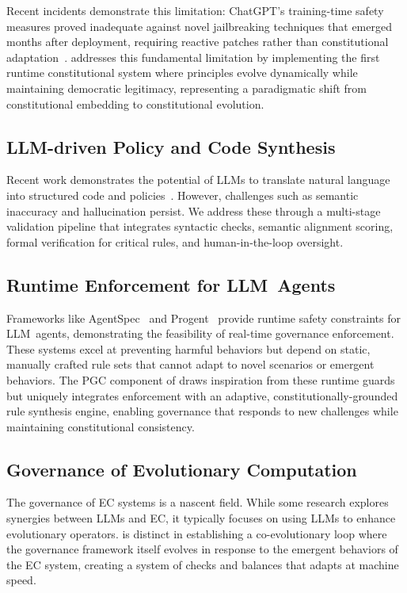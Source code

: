 Recent incidents demonstrate this limitation: ChatGPT's training-time safety measures proved inadequate against novel jailbreaking techniques that emerged months after deployment, requiring reactive patches rather than constitutional adaptation~\cite{wei2023jailbroken}. \acgs{} addresses this fundamental limitation by implementing the first runtime constitutional system where principles evolve dynamically while maintaining democratic legitimacy, representing a paradigmatic shift from constitutional embedding to constitutional evolution.

\subsection{LLM-driven Policy and Code Synthesis}
Recent work demonstrates the potential of LLMs to translate natural language into structured code and policies~\cite{propertygpt2023, veriplan2023}. However, challenges such as semantic inaccuracy and hallucination persist. We address these through a multi-stage validation pipeline that integrates syntactic checks, semantic alignment scoring, formal verification for critical rules, and human-in-the-loop oversight.

\subsection{Runtime Enforcement for LLM\allowbreak~Agents}
Frameworks like AgentSpec~\cite{agentspec2023} and Progent~\cite{progent2023} provide runtime safety constraints for LLM~agents, demonstrating the feasibility of real-time governance enforcement. These systems excel at preventing harmful behaviors but depend on static, manually crafted rule sets that cannot adapt to novel scenarios or emergent behaviors. The PGC component of \acgs{} draws inspiration from these runtime guards but uniquely integrates enforcement with an adaptive, constitutionally-grounded rule synthesis engine, enabling governance that responds to new challenges while maintaining constitutional consistency.

\subsection{Governance of Evolutionary Computation}
The governance of EC systems is a nascent field. While some research explores synergies between LLMs and EC, it typically focuses on using LLMs to enhance evolutionary operators. \acgs{} is distinct in establishing a co-evolutionary loop where the governance framework itself evolves in response to the emergent behaviors of the EC system, creating a system of checks and balances that adapts at machine speed.
